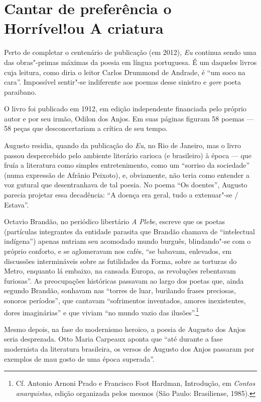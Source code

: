 \section[Cantar de preferência o Horrível! ou A criatura]{Cantar de preferência o Horrível!\break ou A criatura}

Perto de completar o centenário de publicação (em 2012), \textit{Eu}
continua sendo uma das obras"-primas máximas da poesia em língua
portuguesa. É um daqueles livros cuja leitura, como diria o leitor
Carlos Drummond de Andrade, é “um soco na cara”. Impossível sentir"-se
indiferente aos poemas desse sinistro e \textit{gore} poeta
paraibano.

O livro foi publicado em 1912, em edição independente financiada
pelo próprio autor e por seu irmão, Odilon dos Anjos. Em suas páginas
figuram 58 poemas --- 58 peças que desconcertariam a crítica de seu
tempo. 

Augusto residia, quando da publicação do \textit{Eu}, no Rio de
Janeiro, mas o livro passou despercebido pelo ambiente literário
carioca (e brasileiro) à época --- que fruía a literatura como simples
entretenimento, como um “sorriso da sociedade” (numa expressão de
Afrânio Peixoto), e, obviamente, não teria como entender a voz gutural
que desentranhava de tal poesia. No poema “Os doentes”,
Augusto parecia projetar essa decadência: “A doença era geral, tudo a
extenuar"-se / Estava”.

Octavio Brandão, no periódico libertário \textit{A Plebe}, escreve
que os poetas (partículas integrantes da entidade parasita que Brandão
chamava de “intelectual indígena”) apenas nutriam seu acomodado mundo
burguês, blindando"-se com o próprio conforto, e se aglomeravam nos
cafés, “se babavam, enlevados, em discussões intermináveis sobre as
futilidades da Forma, sobre as torturas do Metro, enquanto lá embaixo,
na cansada Europa, as revoluções rebentavam furiosas”. As preocupações
históricas passavam ao largo dos poetas que, ainda segundo Brandão,
sonhavam nas “torres de luar, burilando frases preciosas, sonoros
períodos”, que cantavam “sofrimentos inventados, amores inexistentes,
dores imaginárias” e que viviam “no mundo vazio das ilusões”.\footnote{
Cf. Antonio Arnoni Prado e Francisco Foot
Hardman, Introdução, em \textit{Contos anarquistas}, edição organizada pelos
mesmos (São Paulo: Brasiliense, 1985).}

Mesmo depois, na fase do modernismo heroico, a poesia de Augusto dos
Anjos seria desprezada. Otto Maria Carpeaux aponta que “até durante a			%
fase modernista da literatura brasileira, os versos de Augusto dos
Anjos passaram por exemplos de mau gosto de uma época superada”. 

